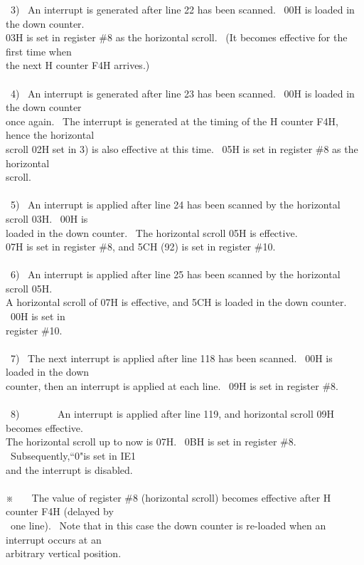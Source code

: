 \documentclass[a4paper,10pt]{article}
\begin{document}
\newpage

\noindent \ 3) \ An interrupt is generated after line 22 has been scanned. \ 00H is loaded in the down counter.\\
03H is set in register \#8 as the horizontal scroll. \ (It becomes effective for the first time when\\
the next H counter F4H arrives.)\\
\\
\phantom \ 4) \ An interrupt is generated after line 23 has been scanned. \ 00H is loaded in the down counter\\
once again. \ The interrupt is generated at the timing of the H counter F4H, hence the horizontal\\
scroll 02H set in 3) is also effective at this time. \ 05H is set in register \#8 as the horizontal\\
scroll.\\
\\
\phantom \ 5) \ An interrupt is applied after line 24 has been scanned by the horizontal scroll 03H. \ 00H is\\
loaded in the down counter. \ The horizontal scroll 05H is effective.\\
07H is set in register \#8, and 5CH (92) is set in register \#10.\\
\\
\phantom \ 6) \ An interrupt is applied after line 25 has been scanned by the horizontal scroll 05H.\\
A horizontal scroll of 07H is effective, and 5CH is loaded in the down counter. \ 00H is set in\\
register \#10.\\
\\
\phantom \ 7) \ The next interrupt is applied after line 118 has been scanned. \ 00H is loaded in the down\\
counter, then an interrupt is applied at each line. \ 09H is set in register \#8.\\
\\
\phantom \ 8) \ \ \ \ \ \ \ An interrupt is applied after line 119, and horizontal scroll 09H becomes effective.\\
The horizontal scroll up to now is 07H. \ 0BH is set in register \#8. \ Subsequently,“0"is set in IE1\\
and the interrupt is disabled.\\
\\
※ \ \ \ The value of register \#8 (horizontal scroll) becomes effective after H counter F4H (delayed by\\
\phantom \ one line). \ Note that in this case the down counter is re-loaded when an interrupt occurs at an\\
arbitrary vertical position.
\end{document}
